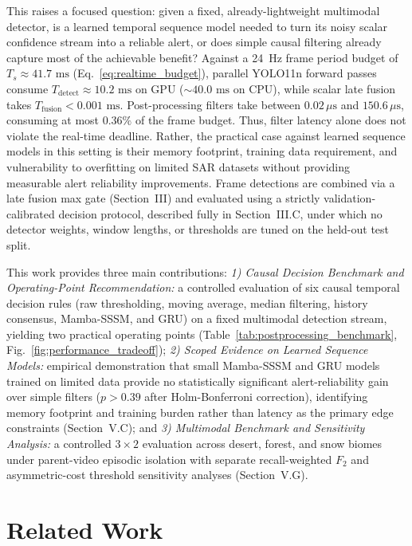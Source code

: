 \documentclass[conference]{IEEEtran}
\begin{document}
This raises a focused question: given a fixed, already-lightweight multimodal detector, is a learned temporal sequence model needed to turn its noisy scalar confidence stream into a reliable alert, or does simple causal filtering already capture most of the achievable benefit? Against a 24~Hz frame period budget of $T_s \approx 41.7\text{ ms}$ (Eq.~\eqref{eq:realtime_budget}), parallel YOLO11n forward passes consume $T_{\text{detect}} \approx 10.2\text{ ms}$ on GPU ($\sim 40.0\text{ ms}$ on CPU), while scalar late fusion takes $T_{\text{fusion}} < 0.001\text{ ms}$. Post-processing filters take between $0.02\,\mu\text{s}$ and $150.6\,\mu\text{s}$, consuming at most $0.36\%$ of the frame budget. Thus, filter latency alone does not violate the real-time deadline. Rather, the practical case against learned sequence models in this setting is their memory footprint, training data requirement, and vulnerability to overfitting on limited SAR datasets without providing measurable alert reliability improvements. Frame detections are combined via a late fusion max gate (Section~III) and evaluated using a strictly validation-calibrated decision protocol, described fully in Section~III.C, under which no detector weights, window lengths, or thresholds are tuned on the held-out test split.

This work provides three main contributions: \textit{1) Causal Decision Benchmark and Operating-Point Recommendation:} a controlled evaluation of six causal temporal decision rules (raw thresholding, moving average, median filtering, history consensus, Mamba-SSSM, and GRU) on a fixed multimodal detection stream, yielding two practical operating points (Table~\ref{tab:postprocessing_benchmark}, Fig.~\ref{fig:performance_tradeoff}); \textit{2) Scoped Evidence on Learned Sequence Models:} empirical demonstration that small Mamba-SSSM and GRU models trained on limited data provide no statistically significant alert-reliability gain over simple filters ($p > 0.39$ after Holm-Bonferroni correction), identifying memory footprint and training burden rather than latency as the primary edge constraints (Section~V.C); and \textit{3) Multimodal Benchmark and Sensitivity Analysis:} a controlled $3\times 2$ evaluation across desert, forest, and snow biomes under parent-video episodic isolation with separate recall-weighted $F_2$ and asymmetric-cost threshold sensitivity analyses (Section~V.G).

\section{Related Work}
\end{document}
